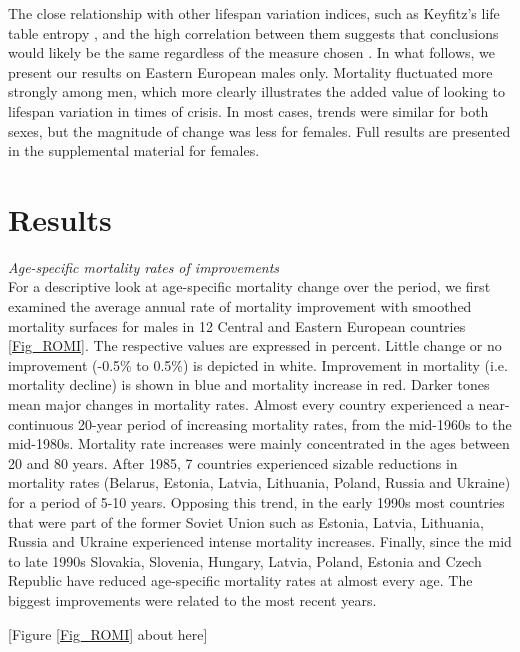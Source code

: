\documentclass{article}
\begin{document}
\begin{spacing}{1.5}
 
The close relationship with other lifespan variation indices, such as Keyfitz's life table entropy \citep{vaupel&Canudas2003}, and the high correlation between them suggests that conclusions would likely be the same regardless of the measure chosen \citep{vanraalte2013,vaupel2011,wilmoth1999}.
In what follows, we present our results on Eastern European males only. Mortality fluctuated more strongly among men, which more clearly illustrates the added value of looking to lifespan variation in times of crisis. In most cases, trends were similar for both sexes, but the magnitude of change was less for females. Full results are presented in the supplemental material for females.



\section*{Results}
\emph{Age-specific mortality rates of improvements}\\

For a descriptive look at age-specific mortality change over the period, we first examined the average annual rate of mortality improvement \citep{Rau2013} with smoothed mortality surfaces \citep{Camarda2012} for males in 12 Central and Eastern European countries \ref{Fig_ROMI}. The respective values are expressed in percent. Little change or no improvement (-0.5\% to 0.5\%) is depicted in white. Improvement in mortality (i.e. mortality decline) is shown in blue and mortality increase in red. Darker tones mean major changes in mortality rates.
Almost every country experienced a near-continuous 20-year period of increasing mortality rates, from the mid-1960s to the mid-1980s. Mortality rate increases were mainly concentrated in the ages between 20 and 80 years. After 1985, 7 countries experienced sizable reductions in mortality rates (Belarus, Estonia, Latvia, Lithuania, Poland, Russia and Ukraine) for a period of 5-10 years. Opposing this trend, in the early 1990s most countries that were part of the former Soviet Union such as Estonia, Latvia, Lithuania, Russia and Ukraine experienced intense mortality increases. Finally, since the mid to late 1990s Slovakia, Slovenia, Hungary, Latvia, Poland, Estonia and Czech Republic have reduced age-specific mortality rates at almost every age. The biggest improvements were related to the most recent years.\\



\begin{center}
[Figure \ref{Fig_ROMI} about here]
\end{center}


\end{spacing}
\end{document}
